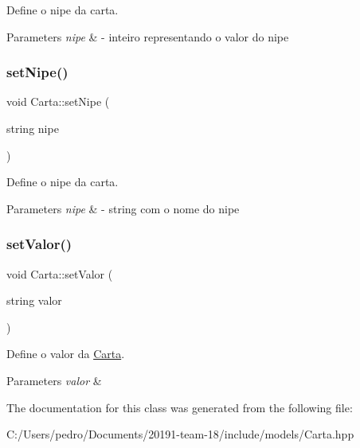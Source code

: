 Define o nipe da carta. 


\begin{DoxyParams}{Parameters}
{\em nipe} & -\/ inteiro representando o valor do nipe \\
\hline
\end{DoxyParams}
\mbox{\label{class_carta_a770fd5ddbf8d3378a0179420ced840e0}} 
\subsubsection{\texorpdfstring{setNipe()}{setNipe()}\hspace{0.1cm}{\footnotesize\ttfamily [2/2]}}
{\footnotesize\ttfamily void Carta\+::set\+Nipe (\begin{DoxyParamCaption}\item[{string}]{nipe }\end{DoxyParamCaption})}



Define o nipe da carta. 


\begin{DoxyParams}{Parameters}
{\em nipe} & -\/ string com o nome do nipe \\
\hline
\end{DoxyParams}
\mbox{\label{class_carta_a66b728786354a62104ef2475b5376fea}} 
\subsubsection{\texorpdfstring{setValor()}{setValor()}}
{\footnotesize\ttfamily void Carta\+::set\+Valor (\begin{DoxyParamCaption}\item[{string}]{valor }\end{DoxyParamCaption})}



Define o valor da \mbox{\hyperlink{class_carta}{Carta}}. 


\begin{DoxyParams}{Parameters}
{\em valor} & \\
\hline
\end{DoxyParams}


The documentation for this class was generated from the following file\+:\begin{DoxyCompactItemize}
\item 
C\+:/\+Users/pedro/\+Documents/20191-\/team-\/18/include/models/Carta.\+hpp\end{DoxyCompactItemize}
